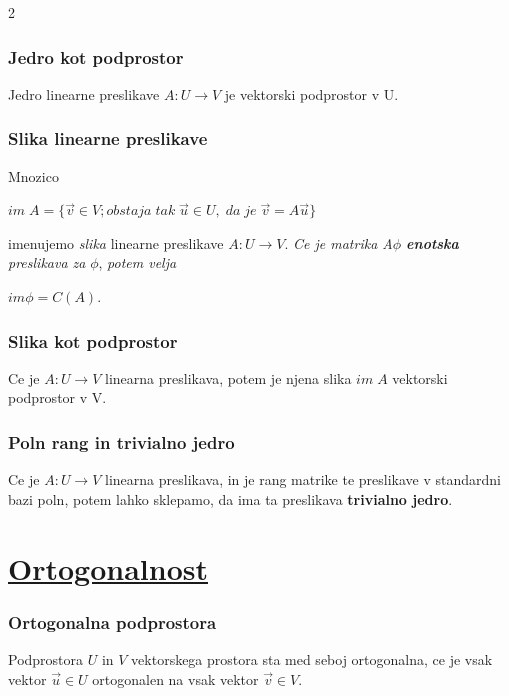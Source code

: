 \documentclass{article}
\begin{document}
\begin{multicols}{2}
	\subsubsection{Jedro kot podprostor}

	Jedro linearne preslikave $A: U \rightarrow V$ je vektorski podprostor v U.

	\subsubsection{Slika linearne preslikave}

	Mnozico
	\begin{center}
		$im\; A = \{ \vec{v} \in V; obstaja\; tak\; \vec{u} \in U,\; da\; je\; \vec{v} = A\vec{u} \}$
	\end{center}
	imenujemo \textit{slika} linearne preslikave $A: U \rightarrow V$.
	\textit{Ce je matrika A$\phi$ \textbf{enotska} preslikava za } $\phi$, \textit{potem velja}
	\begin{center}
		\begin{math}
			im \phi = C(A).
		\end{math}
	\end{center}

	\subsubsection{Slika kot podprostor}

	Ce je $A: U \rightarrow V$ linearna preslikava, potem je njena slika $im\; A$
	vektorski podprostor v V.

	\subsubsection{Poln rang in trivialno jedro}

	Ce je $A: U \rightarrow V$ linearna preslikava, in je rang matrike te preslikave v standardni bazi poln,
	potem lahko sklepamo, da ima  ta preslikava \textbf{trivialno jedro}.


	\section{\underline{Ortogonalnost}}

	\subsubsection{Ortogonalna podprostora}

	Podprostora $U$ in $V$ vektorskega prostora sta med seboj ortogonalna,
	ce je vsak vektor $\vec{u} \in U$ ortogonalen na vsak vektor $\vec{v} \in V$.


\end{multicols}
\end{document}
